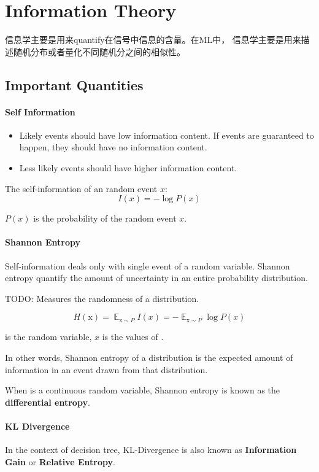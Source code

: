 \documentclass{ctexart}
\DeclareMathOperator{\E}{\mathbb{E}}
\begin{document}
\tableofcontents


\section{ Information Theory }

信息学主要是用来quantify在信号中信息的含量。在ML中， 信息学主要是用来描述随机分布或者量化不同随机分之间的相似性。

\subsection{ Important Quantities }

\paragraph{Self Information}

\begin{itemize}
    \item Likely events should have low information content. If events are guaranteed to happen, they should have no information content.
    
    \item Less likely events should have higher information content.
\end{itemize}

The self-information of an random event \( x \): 
\begin{equation}
I(x) = - \log P(x)
\end{equation}

\( P(x) \) is the probability of the random event \( x \).

\paragraph{Shannon Entropy}

Self-information deals only with single event of a random variable. Shannon entropy quantify the amount of uncertainty in an entire probability distribution.

TODO: Measures the randomness of a distribution.

\begin{equation}
    H( \text{x} ) = \E_{\text{x} \sim P} I(x) = -\E_{\text{x} \sim P} \log P(x)
\end{equation}

 is the random variable, \( x \) is the values of .

In other words, Shannon entropy of a distribution is the expected amount of information in an event drawn from that distribution.

When  is a continuous random variable, Shannon entropy is known as the \textbf{differential entropy}.

\paragraph{KL Divergence}

In the context of decision tree, KL-Divergence is also known as \textbf{Information Gain} or \textbf{Relative Entropy}.
\end{document}

